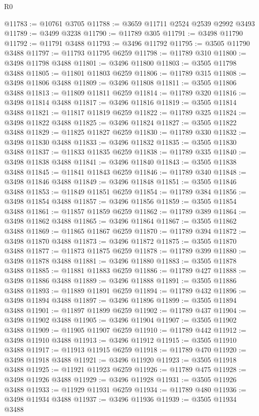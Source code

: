 \begin{lexlean}{R0}
\begin{coremodule}
@11783 := @10761 @3705
@11788 := @3659 @11711 @2524 @2539 @2992 @3493
@11789 := @3499 @3238
@11790 := @11789 @305
@11791 := @3498 @11790
@11792 := @11791 @3488
@11793 := @3496 @11792
@11795 := @3505 @11790 @3488
@11797 := @11793 @11795 @6259
@11798 := @11789 @310
@11800 := @3498 @11798 @3488
@11801 := @3496 @11800
@11803 := @3505 @11798 @3488
@11805 := @11801 @11803 @6259
@11806 := @11789 @315
@11808 := @3498 @11806 @3488
@11809 := @3496 @11808
@11811 := @3505 @11806 @3488
@11813 := @11809 @11811 @6259
@11814 := @11789 @320
@11816 := @3498 @11814 @3488
@11817 := @3496 @11816
@11819 := @3505 @11814 @3488
@11821 := @11817 @11819 @6259
@11822 := @11789 @325
@11824 := @3498 @11822 @3488
@11825 := @3496 @11824
@11827 := @3505 @11822 @3488
@11829 := @11825 @11827 @6259
@11830 := @11789 @330
@11832 := @3498 @11830 @3488
@11833 := @3496 @11832
@11835 := @3505 @11830 @3488
@11837 := @11833 @11835 @6259
@11838 := @11789 @335
@11840 := @3498 @11838 @3488
@11841 := @3496 @11840
@11843 := @3505 @11838 @3488
@11845 := @11841 @11843 @6259
@11846 := @11789 @340
@11848 := @3498 @11846 @3488
@11849 := @3496 @11848
@11851 := @3505 @11846 @3488
@11853 := @11849 @11851 @6259
@11854 := @11789 @384
@11856 := @3498 @11854 @3488
@11857 := @3496 @11856
@11859 := @3505 @11854 @3488
@11861 := @11857 @11859 @6259
@11862 := @11789 @389
@11864 := @3498 @11862 @3488
@11865 := @3496 @11864
@11867 := @3505 @11862 @3488
@11869 := @11865 @11867 @6259
@11870 := @11789 @394
@11872 := @3498 @11870 @3488
@11873 := @3496 @11872
@11875 := @3505 @11870 @3488
@11877 := @11873 @11875 @6259
@11878 := @11789 @399
@11880 := @3498 @11878 @3488
@11881 := @3496 @11880
@11883 := @3505 @11878 @3488
@11885 := @11881 @11883 @6259
@11886 := @11789 @427
@11888 := @3498 @11886 @3488
@11889 := @3496 @11888
@11891 := @3505 @11886 @3488
@11893 := @11889 @11891 @6259
@11894 := @11789 @432
@11896 := @3498 @11894 @3488
@11897 := @3496 @11896
@11899 := @3505 @11894 @3488
@11901 := @11897 @11899 @6259
@11902 := @11789 @437
@11904 := @3498 @11902 @3488
@11905 := @3496 @11904
@11907 := @3505 @11902 @3488
@11909 := @11905 @11907 @6259
@11910 := @11789 @442
@11912 := @3498 @11910 @3488
@11913 := @3496 @11912
@11915 := @3505 @11910 @3488
@11917 := @11913 @11915 @6259
@11918 := @11789 @470
@11920 := @3498 @11918 @3488
@11921 := @3496 @11920
@11923 := @3505 @11918 @3488
@11925 := @11921 @11923 @6259
@11926 := @11789 @475
@11928 := @3498 @11926 @3488
@11929 := @3496 @11928
@11931 := @3505 @11926 @3488
@11933 := @11929 @11931 @6259
@11934 := @11789 @480
@11936 := @3498 @11934 @3488
@11937 := @3496 @11936
@11939 := @3505 @11934 @3488

\end{coremodule}
\end{lexlean}
